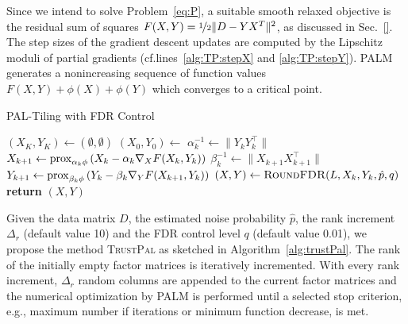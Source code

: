 Since we intend to solve Problem~\eqref{eq:P}, a suitable smooth relaxed objective is the residual sum of squares $F(X,Y)=\nicefrac{1}{2}\|D-YX^T\|^2$, as discussed in Sec.~\ref{}. The step sizes of the gradient descent updates are computed by the Lipschitz moduli of partial gradients (cf.\@ lines~\ref{alg:TP:stepX} and \ref{alg:TP:stepY}). 
PALM generates a nonincreasing sequence of function values $F(X,Y)+\phi(X)+\phi(Y)$ which converges to a critical point.
\begin{algorithm}[t]
\caption{PAL-Tiling with FDR Control}
\begin{algorithmic}[1]
    \State $(X_K,Y_K)\gets (\emptyset, \emptyset)$
    \State $(X_0,Y_0) \gets $ %
    \label{alg:TP:optStart} 
    	\State $\alpha_k^{-1} \gets \|Y_kY_k^\top \|$\label{alg:TP:stepX}
        \State $X_{k+1} \gets \operatorname{prox}_{\alpha_k\phi}\left(X_k-\alpha_k\nabla_XF(X_k,Y_k)\right)$\label{alg:proxX}
       	\State $\beta_k^{-1} \gets\|X_{k+1}X_{k+1}^\top \|$\label{alg:TP:stepY}
        \State $Y_{k+1} \gets \operatorname{prox}_{\beta_k\phi}\left(Y_k-\beta_k\nabla_YF(X_{k+1},Y_k)\right)$\label{alg:TP:proxY}
    \EndFor
    \State $(X,Y)\gets \Call{RoundFDR}{L,X_k,Y_k,\hat{p},q}$ \label{alg:TP:round}
    	\textbf{return} $(X,Y)$
    \EndIf
    \EndFor
  \EndFunction
\end{algorithmic}
\label{alg:trustPal}
\end{algorithm}

Given the data matrix $D$, the estimated noise probability $\hat{p}$, the rank increment $\Delta_r$ (default value 10) and the FDR control level $q$ (default value 0.01), we propose the method \textsc{TrustPal} as sketched in Algorithm~\ref{alg:trustPal}. The rank of the initially empty factor matrices is iteratively incremented. With every rank increment, $\Delta_r$ random columns are appended to the current factor matrices and the numerical optimization by PALM is performed until a selected stop criterion, e.g., maximum number if iterations or minimum function decrease, is met. %

